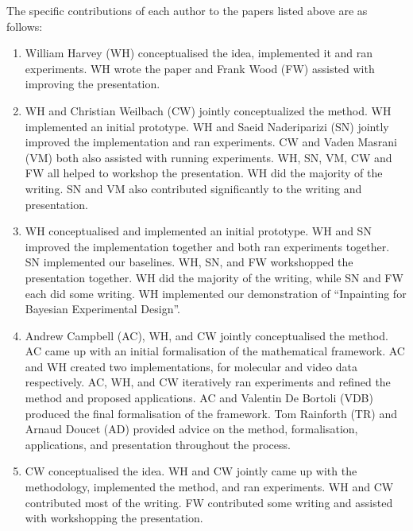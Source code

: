 
The specific contributions of each author to the papers listed above are as follows:
\begin{enumerate}
    \item William Harvey (WH) conceptualised the idea, implemented it and ran experiments. WH wrote the paper and Frank Wood (FW) assisted with improving the presentation.
    \item WH and Christian Weilbach (CW) jointly conceptualized the method. WH implemented an initial prototype. WH and Saeid Naderiparizi (SN) jointly improved the implementation and ran experiments. CW and Vaden Masrani (VM) both also assisted with running experiments. WH, SN, VM, CW and FW all helped to workshop the presentation. WH did the majority of the writing. SN and VM also contributed significantly to the writing and presentation.
    \item WH conceptualised and implemented an initial prototype. WH and SN improved the implementation together and both ran experiments together.  SN implemented our baselines. WH, SN, and FW workshopped the presentation together. WH did the majority of the writing, while SN and FW each did some writing. WH implemented our demonstration of ``Inpainting for Bayesian Experimental Design''.
    \item Andrew Campbell (AC), WH, and CW jointly conceptualised the method. AC came up with an initial formalisation of the mathematical framework. AC and WH created two implementations, for molecular and video data respectively. AC, WH, and CW iteratively ran experiments and refined the method and proposed applications. AC and Valentin De Bortoli (VDB) produced the final formalisation of the framework. Tom Rainforth (TR) and Arnaud Doucet (AD) provided advice on the method, formalisation, applications, and presentation throughout the process.
    \item CW conceptualised the idea. WH and CW jointly came up with the methodology, implemented the method, and ran experiments. WH and CW contributed most of the writing. FW contributed some writing and assisted with workshopping the presentation.  
\end{enumerate}